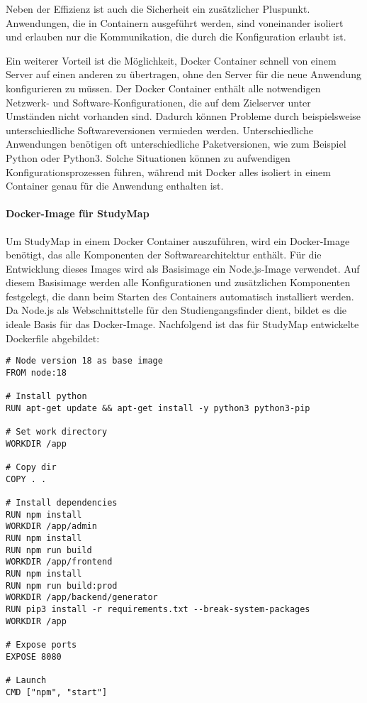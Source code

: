 Neben der Effizienz ist auch die Sicherheit ein zusätzlicher Pluspunkt. Anwendungen, die in Containern ausgeführt werden, sind voneinander isoliert und erlauben nur die Kommunikation, die durch die Konfiguration erlaubt ist. \parencite{docker_inc_what_2024}

Ein weiterer Vorteil ist die Möglichkeit, Docker Container schnell von einem Server auf einen anderen zu übertragen, ohne den Server für die neue Anwendung konfigurieren zu müssen. Der Docker Container enthält alle notwendigen Netzwerk- und Software-Konfigurationen, die auf dem Zielserver unter Umständen nicht vorhanden sind. Dadurch können Probleme durch beispielsweise unterschiedliche Softwareversionen vermieden werden. Unterschiedliche Anwendungen benötigen oft unterschiedliche Paketversionen, wie zum Beispiel Python oder Python3. Solche Situationen können zu aufwendigen Konfigurationsprozessen führen, während mit Docker alles isoliert in einem Container genau für die Anwendung enthalten ist. \parencite{amazon_web_services_inc_was_2023}

\paragraph*{Docker-Image für StudyMap}
Um StudyMap in einem Docker Container auszuführen, wird ein Docker-Image benötigt, das alle Komponenten der Softwarearchitektur enthält. Für die Entwicklung dieses Images wird als Basisimage ein Node.js-Image verwendet. Auf diesem Basisimage werden alle Konfigurationen und zusätzlichen Komponenten festgelegt, die dann beim Starten des Containers automatisch installiert werden. Da Node.js als Webschnittstelle für den Studiengangsfinder dient, bildet es die ideale Basis für das Docker-Image. Nachfolgend ist das für StudyMap entwickelte Dockerfile abgebildet:

\noindent
\begin{minipage}{\linewidth}
\begin{lstlisting}[style=Python]
# Node version 18 as base image
FROM node:18

# Install python
RUN apt-get update && apt-get install -y python3 python3-pip

# Set work directory
WORKDIR /app

# Copy dir
COPY . .

# Install dependencies
RUN npm install
WORKDIR /app/admin
RUN npm install
RUN npm run build
WORKDIR /app/frontend
RUN npm install
RUN npm run build:prod
WORKDIR /app/backend/generator
RUN pip3 install -r requirements.txt --break-system-packages
WORKDIR /app

# Expose ports
EXPOSE 8080

# Launch
CMD ["npm", "start"]
\end{lstlisting}
\end{minipage}


